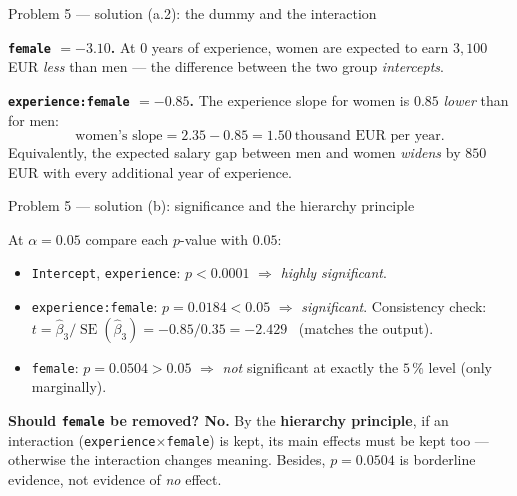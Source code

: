 \documentclass[aspectratio=169,11pt]{beamer}
\begin{document}
\begin{frame}{Problem 5 --- solution (a.2): the dummy and the interaction}
  \begin{solutionbox}
    \textbf{\texttt{female} $=-3.10$.} At $0$ years of experience, women are expected to earn
    $3{,}100$ EUR \emph{less} than men --- the difference between the two group \emph{intercepts}.
    \medskip

    \textbf{\texttt{experience:female} $=-0.85$.} The experience slope for women is $0.85$
    \emph{lower} than for men:
    \[
      \text{women's slope}=2.35-0.85=1.50\ \text{thousand EUR per year}.
    \]
    Equivalently, the expected salary gap between men and women \emph{widens} by $850$ EUR with
    every additional year of experience.
  \end{solutionbox}
\end{frame}

\begin{frame}{Problem 5 --- solution (b): significance and the hierarchy principle}
  \begin{solutionbox}
    At $\alpha=0.05$ compare each $p$-value with $0.05$:
    \begin{itemize}
      \item \texttt{Intercept}, \texttt{experience}: $p<0.0001$ $\Rightarrow$ \emph{highly significant}.
      \item \texttt{experience:female}: $p=0.0184<0.05$ $\Rightarrow$ \emph{significant}.
        Consistency check: $t=\hat\beta_3/\operatorname{SE}(\hat\beta_3)=-0.85/0.35=-2.429$
        \checkmark\ (matches the output).
      \item \texttt{female}: $p=0.0504>0.05$ $\Rightarrow$ \emph{not} significant at exactly the
        $5\,\%$ level (only marginally).
    \end{itemize}
    \textbf{Should \texttt{female} be removed? No.} By the \textbf{hierarchy principle}, if an
    interaction (\texttt{experience}$\times$\texttt{female}) is kept, its main effects must be
    kept too --- otherwise the interaction changes meaning. Besides, $p=0.0504$ is borderline
    evidence, not evidence of \emph{no} effect.
  \end{solutionbox}
\end{frame}
\end{document}
